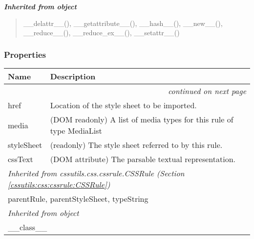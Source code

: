 \large{\textbf{\textit{Inherited from object}}}

\begin{quote}
\_\_delattr\_\_(), \_\_getattribute\_\_(), \_\_hash\_\_(), \_\_new\_\_(), \_\_reduce\_\_(), \_\_reduce\_ex\_\_(), \_\_setattr\_\_()
\end{quote}


  \subsubsection{Properties}

    \vspace{-1cm}
\hspace{\varindent}\begin{longtable}{|p{\varnamewidth}|p{\vardescrwidth}|l}
\cline{1-2}
\cline{1-2} \centering \textbf{Name} & \centering \textbf{Description}& \\
\cline{1-2}
\endhead\cline{1-2}\multicolumn{3}{r}{\small\textit{continued on next page}}\\\endfoot\cline{1-2}
\endlastfoot\raggedright h\-r\-e\-f\- & \raggedright Location of the style sheet to be imported.&\\
\cline{1-2}
\raggedright m\-e\-d\-i\-a\- & \raggedright (DOM readonly) A list of media types for this rule of type            MediaList&\\
\cline{1-2}
\raggedright s\-t\-y\-l\-e\-S\-h\-e\-e\-t\- & \raggedright (readonly) The style sheet referred to by this rule.&\\
\cline{1-2}
\raggedright c\-s\-s\-T\-e\-x\-t\- & \raggedright (DOM attribute) The parsable textual representation.&\\
\cline{1-2}
\multicolumn{2}{|l|}{\textit{Inherited from cssutils.css.cssrule.CSSRule \textit{(Section \ref{cssutils:css:cssrule:CSSRule})}}}\\
\multicolumn{2}{|p{\varwidth}|}{\raggedright parentRule, parentStyleSheet, typeString}\\
\cline{1-2}
\multicolumn{2}{|l|}{\textit{Inherited from object}}\\
\multicolumn{2}{|p{\varwidth}|}{\raggedright \_\_class\_\_}\\
\cline{1-2}
\end{longtable}


